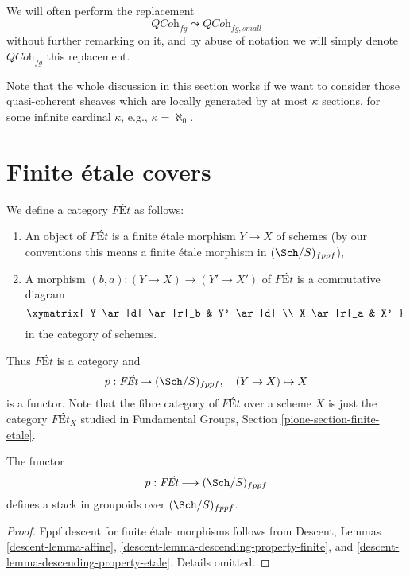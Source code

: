 \noindent
We will often perform the replacement
$$
\textit{QCoh}_{fg} \leadsto \textit{QCoh}_{fg, small}
$$
without further remarking on it, and by abuse of notation we will
simply denote $\textit{QCoh}_{fg}$ this replacement.

\begin{remark}
\label{remark-higher-rank}
Note that the whole discussion in this section works
if we want to consider those
quasi-coherent sheaves which are locally generated by at most $\kappa$
sections, for some infinite cardinal $\kappa$, e.g., $\kappa = \aleph_0$.
\end{remark}





\section{Finite \'etale covers}
\label{section-finite-etale}

\noindent
We define a category $\textit{F\'Et}$ as follows:
\begin{enumerate}
\item An object of $\textit{F\'Et}$ is a finite \'etale morphism $Y \to X$
of schemes (by our conventions this means a finite \'etale morphism
in $(\Sch/S)_{fppf}$),
\item A morphism $(b, a) : (Y \to X) \to (Y' \to X')$ of $\textit{F\'Et}$
is a commutative diagram
$$
\xymatrix{
Y \ar[d] \ar[r]_b & Y' \ar[d] \\
X \ar[r]_a & X'
}
$$
in the category of schemes.
\end{enumerate}
Thus $\textit{F\'Et}$ is a category and
$$
p : \textit{F\'Et} \to (\Sch/S)_{fppf},
\quad
(Y \to X) \mapsto X
$$
is a functor. Note that the fibre category of $\textit{F\'Et}$ over
a scheme $X$ is just the category $\textit{F\'Et}_X$ studied in
Fundamental Groups, Section \ref{pione-section-finite-etale}.

\begin{lemma}
\label{lemma-finite-etale-stack}
The functor
$$
p : \textit{F\'Et} \longrightarrow (\Sch/S)_{fppf}
$$
defines a stack in groupoids over $(\Sch/S)_{fppf}$.
\end{lemma}

\begin{proof}
Fppf descent for finite \'etale morphisms follows from
Descent, Lemmas \ref{descent-lemma-affine},
\ref{descent-lemma-descending-property-finite}, and
\ref{descent-lemma-descending-property-etale}.
Details omitted.
\end{proof}






